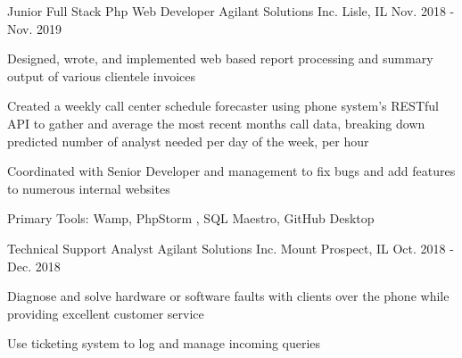 


\begin{cventries}



\cventry
{Junior Full Stack Php Web Developer} %
{Agilant Solutions Inc.} %
{Lisle, IL} %
{Nov. 2018 - Nov. 2019} %
{ %
\begin{cvitems}
\item {Designed, wrote, and implemented web based report processing and summary output of various clientele invoices}
\item {Created a weekly call center schedule forecaster using phone system's RESTful API to gather and average the most recent months call data, breaking down predicted number of analyst needed per day of the week, per hour}
\item {Coordinated with Senior Developer and management to fix bugs and add features to numerous internal websites}
\item {Primary Tools: Wamp, PhpStorm , SQL Maestro, GitHub Desktop}
\end{cvitems}
}

\cventry
{Technical Support Analyst} %
{Agilant Solutions Inc.} %
{Mount Prospect, IL} %
{Oct. 2018 - Dec. 2018} %
{ %
\begin{cvitems}
\item {Diagnose and solve hardware or software faults with clients over the phone while providing excellent customer service}
\item {Use ticketing system to log and manage incoming queries}
\end{cvitems}
}



\end{cventries}